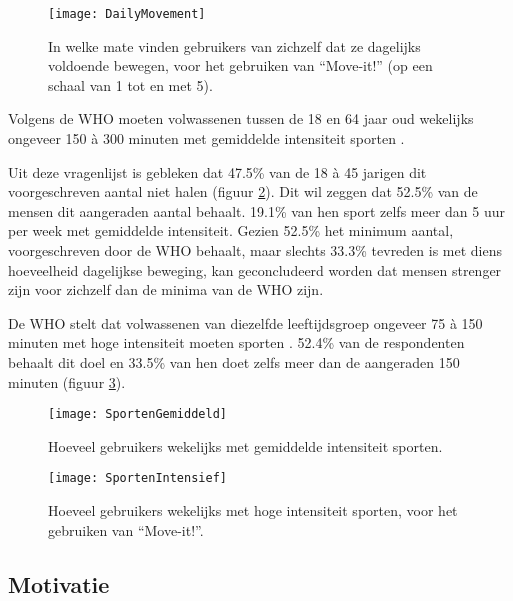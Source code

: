 \begin{figure}
    \caption[In welke mate vinden gebruikers van zichzelf dat ze dagelijks voldoende bewegen, voor het gebruiken van ``Move-it!'']{In welke mate vinden gebruikers van zichzelf dat ze dagelijks voldoende bewegen, voor het gebruiken van ``Move-it!'' (op een schaal van 1 tot en met 5).}
    \texttt{[image: DailyMovement]}
    \label{fig:dagelijkseBeweging}
\end{figure}

Volgens de WHO moeten volwassenen tussen de 18 en 64 jaar oud wekelijks ongeveer 150 à 300 minuten met gemiddelde intensiteit sporten \autocite{Bull2020}.

Uit deze vragenlijst is gebleken dat 47.5\% van de 18 à 45 jarigen dit voorgeschreven aantal niet halen (figuur \ref{fig:gemiddeldSporten}). Dit wil zeggen dat 52.5\% van de mensen dit aangeraden aantal behaalt. 19.1\% van hen sport zelfs meer dan 5 uur per week met gemiddelde intensiteit. Gezien 52.5\% het minimum aantal, voorgeschreven door de WHO behaalt, maar slechts 33.3\% tevreden is met diens hoeveelheid dagelijkse beweging, kan geconcludeerd worden dat mensen strenger zijn voor zichzelf dan de minima van de WHO zijn.

De WHO stelt dat volwassenen van diezelfde leeftijdsgroep ongeveer 75 à 150 minuten met hoge intensiteit moeten sporten \autocite{Bull2020}.
52.4\% van de respondenten behaalt dit doel en 33.5\% van hen doet zelfs meer dan de aangeraden 150 minuten (figuur \ref{fig:intensiefSporten}).

\begin{figure}[h]
    \caption[Hoeveel gebruikers wekelijks met gemiddelde intensiteit sporten, voor het gebruiken van ``Move-it!'']{Hoeveel gebruikers wekelijks met gemiddelde intensiteit sporten.}
    \texttt{[image: SportenGemiddeld]}
    \label{fig:gemiddeldSporten}
\end{figure}

\begin{figure}[h]
    \caption[Hoeveel gebruikers wekelijks met hoge intensiteit sporten, voor het gebruiken van ``Move-it!'']{Hoeveel gebruikers wekelijks met hoge intensiteit sporten, voor het gebruiken van ``Move-it!''.}
    \texttt{[image: SportenIntensief]}
    \label{fig:intensiefSporten}
\end{figure}

\subsection{Motivatie}

